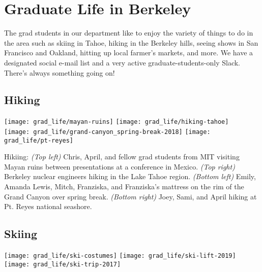 
\newpage
{}
\section*{Graduate Life in Berkeley}
The grad students in our department like to enjoy the variety of things to do in the area such as skiing in Tahoe, hiking in the Berkeley hills, seeing shows in San Francisco and Oakland, hitting up local farmer's markets, and more.
We have a designated social e-mail list and a very active graduate-students-only Slack. There’s always something going on!

\subsection*{Hiking}

\begin{minipage}{\textwidth}
  \begin{center}
  	\texttt{[image: grad\_life/mayan-ruins]}
	\texttt{[image: grad\_life/hiking-tahoe]}\\
	\texttt{[image: grad\_life/grand-canyon\_spring-break-2018]}
    \texttt{[image: grad\_life/pt-reyes]}
  \end{center}
\end{minipage}

Hikiing: 
\textit{(Top left)} Chris, April, and fellow grad students from MIT visiting Mayan ruins between presentations at a conference in Mexico. 
\textit{(Top right)} Berkeley nuclear engineers hiking in the Lake Tahoe region. 
\textit{(Bottom left)} Emily, Amanda Lewis, Mitch, Franziska, and Franziska's mattress on the rim of the Grand Canyon over spring break. 
\textit{(Bottom right)} Joey, Sami, and April hiking at Pt. Reyes national seashore.


\subsection*{Skiing}

\begin{minipage}{\textwidth}
  \begin{center}
    \texttt{[image: grad\_life/ski-costumes]}\hfill
    \texttt{[image: grad\_life/ski-lift-2019]}\\
    \vspace{0.5cm}
    \texttt{[image: grad\_life/ski-trip-2017]}
  \end{center}
\end{minipage}

